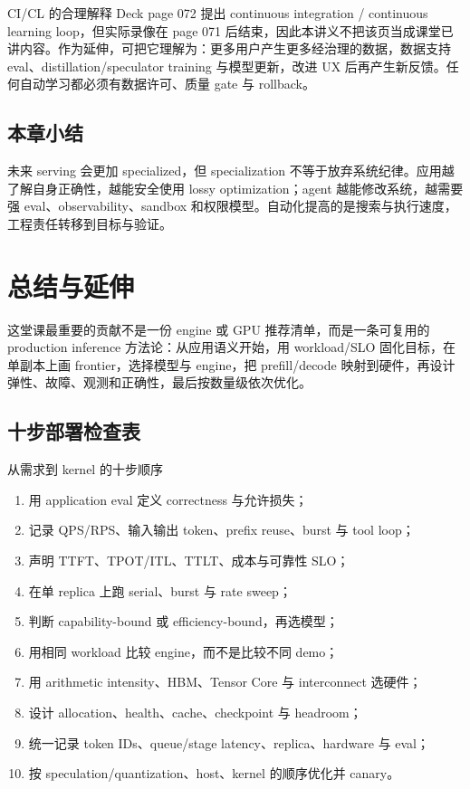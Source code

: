 \documentclass[a4paper]{article}
\begin{document}
\begin{importantbox}{CI/CL 的合理解释}
Deck page 072 提出 continuous integration / continuous learning loop，但实际录像在 page 071 后结束，因此本讲义不把该页当成课堂已讲内容。作为延伸，可把它理解为：更多用户产生更多经治理的数据，数据支持 eval、distillation/speculator training 与模型更新，改进 UX 后再产生新反馈。任何自动学习都必须有数据许可、质量 gate 与 rollback。
\end{importantbox}

\subsection{本章小结}

未来 serving 会更加 specialized，但 specialization 不等于放弃系统纪律。应用越了解自身正确性，越能安全使用 lossy optimization；agent 越能修改系统，越需要强 eval、observability、sandbox 和权限模型。自动化提高的是搜索与执行速度，工程责任转移到目标与验证。

\section{总结与延伸}

这堂课最重要的贡献不是一份 engine 或 GPU 推荐清单，而是一条可复用的 production inference 方法论：从应用语义开始，用 workload/SLO 固化目标，在单副本上画 frontier，选择模型与 engine，把 prefill/decode 映射到硬件，再设计弹性、故障、观测和正确性，最后按数量级依次优化。

\subsection{十步部署检查表}

\begin{importantbox}{从需求到 kernel 的十步顺序}
\begin{enumerate}
  \item 用 application eval 定义 correctness 与允许损失；
  \item 记录 QPS/RPS、输入输出 token、prefix reuse、burst 与 tool loop；
  \item 声明 TTFT、TPOT/ITL、TTLT、成本与可靠性 SLO；
  \item 在单 replica 上跑 serial、burst 与 rate sweep；
  \item 判断 capability-bound 或 efficiency-bound，再选模型；
  \item 用相同 workload 比较 engine，而不是比较不同 demo；
  \item 用 arithmetic intensity、HBM、Tensor Core 与 interconnect 选硬件；
  \item 设计 allocation、health、cache、checkpoint 与 headroom；
  \item 统一记录 token IDs、queue/stage latency、replica、hardware 与 eval；
  \item 按 speculation/quantization、host、kernel 的顺序优化并 canary。
\end{enumerate}
\end{importantbox}
\end{document}
